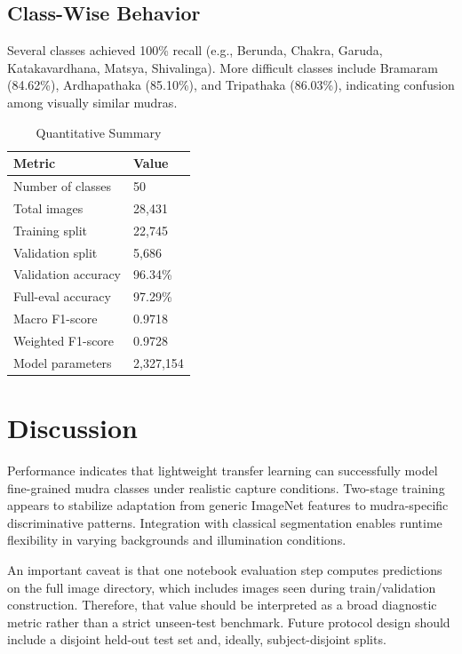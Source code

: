 \documentclass[conference]{IEEEtran}
\begin{document}
\subsection{Class-Wise Behavior}
Several classes achieved 100\% recall (e.g., Berunda, Chakra, Garuda, Katakavardhana, Matsya, Shivalinga). More difficult classes include Bramaram (84.62\%), Ardhapathaka (85.10\%), and Tripathaka (86.03\%), indicating confusion among visually similar mudras.

\begin{table}[t]
\caption{Quantitative Summary}
\label{tab:summary}
\centering
\begin{tabular}{>{\raggedright\arraybackslash}p{}p{}}
\toprule
Metric & Value \\
\midrule
Number of classes & 50 \\
Total images & 28,431 \\
Training split & 22,745 \\
Validation split & 5,686 \\
Validation accuracy & 96.34\% \\
Full-eval accuracy & 97.29\% \\
Macro F1-score & 0.9718 \\
Weighted F1-score & 0.9728 \\
Model parameters & 2,327,154 \\
\bottomrule
\end{tabular}
\end{table}

\section{Discussion}
Performance indicates that lightweight transfer learning can successfully model fine-grained mudra classes under realistic capture conditions. Two-stage training appears to stabilize adaptation from generic ImageNet features to mudra-specific discriminative patterns. Integration with classical segmentation enables runtime flexibility in varying backgrounds and illumination conditions.

An important caveat is that one notebook evaluation step computes predictions on the full image directory, which includes images seen during train/validation construction. Therefore, that value should be interpreted as a broad diagnostic metric rather than a strict unseen-test benchmark. Future protocol design should include a disjoint held-out test set and, ideally, subject-disjoint splits.
\end{document}
